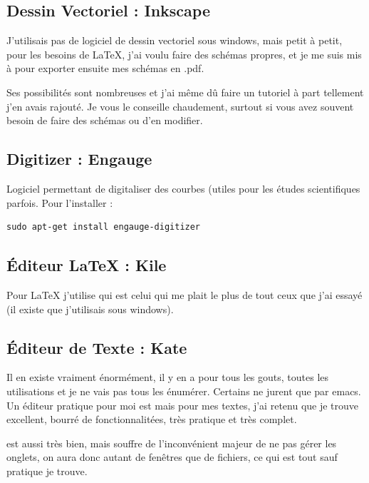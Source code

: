 \documentclass[a4paper,twoside]{article}
\begin{document}
\subsection{Dessin Vectoriel : Inkscape}
J'utilisais pas de logiciel de dessin vectoriel sous windows, mais petit à petit, pour les besoins de \LaTeX, j'ai voulu faire des schémas propres, et je me suis mis à  pour exporter ensuite mes schémas en .pdf. 

Ses possibilités sont nombreuses et j'ai même dû faire un tutoriel à part tellement j'en avais rajouté. Je vous le conseille chaudement, surtout si vous avez souvent besoin de faire des schémas ou d'en modifier.



\subsection{Digitizer : Engauge}
Logiciel permettant de digitaliser des courbes (utiles pour les études scientifiques parfois. Pour l'installer :
\begin{verbatim}
sudo apt-get install engauge-digitizer
\end{verbatim}


\subsection{\'Editeur \LaTeX{} : Kile}
Pour \LaTeX{} j'utilise  qui est celui qui me plait le plus de tout ceux que j'ai essayé (il existe  que j'utilisais sous windows).

\subsection{\'Editeur de Texte : Kate}
Il en existe vraiment énormément, il y en a pour tous les gouts, toutes les utilisations et je ne vais pas tous les énumérer. Certains ne jurent que par emacs. Un éditeur pratique pour moi est  mais pour mes textes, j'ai retenu  que je trouve excellent, bourré de fonctionnalitées, très pratique et très complet.

 est aussi très bien, mais souffre de l'inconvénient majeur de ne pas gérer les onglets, on aura donc autant de fenêtres que de fichiers, ce qui est tout sauf pratique je trouve.
\end{document}
